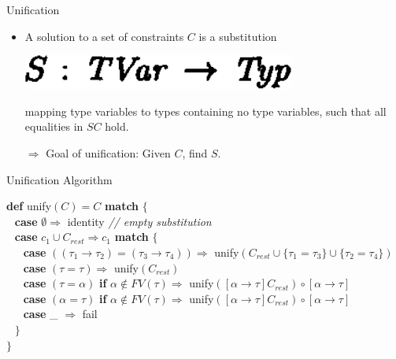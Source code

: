 \documentclass{beamer}
\begin{document}
\begin{frame}{Unification}
\begin{itemize}

\item A solution to a set of constraints $C$ is a substitution

\begin{center}
\includegraphics[scale=0.75]{paper_substitution_type.png}
\end{center}
\vspace{-0.5em}

mapping type variables to types containing no type variables,
such that all equalities in $SC$ hold.


\item[$\Rightarrow$] Goal of unification: Given $C$, find $S$.

\end{itemize}
\end{frame}

\begin{frame}{Unification Algorithm}

\begin{small}

\textbf{def} unify$(C) = C$ \textbf{match} $\{$ \\
$~~$ \textbf{case} $\emptyset \Rightarrow$ identity   \textit{// empty substitution}\\
$~~$ \textbf{case} $c_1 \cup C_{rest} \Rightarrow c_1 $ \textbf{match} $\{$\\
$~~$ $~~$ \textbf{case} $((\tau_1 \rightarrow \tau_2) = (\tau_3 \rightarrow \tau_4)) \Rightarrow$ unify$(C_{rest} \cup \{\tau_1 = \tau_3\} \cup \{\tau_2 = \tau_4\})$\\
$~~$ $~~$ \textbf{case} $(\tau = \tau) \Rightarrow$ unify$(C_{rest})$\\
$~~$ $~~$ \textbf{case} $(\tau = \alpha)$ \textbf{if} $\alpha \notin FV(\tau) \Rightarrow$ unify$([\alpha \rightarrow \tau]C_{rest}) \circ [\alpha \rightarrow \tau]$\\
$~~$ $~~$ \textbf{case} $(\alpha = \tau)$ \textbf{if} $\alpha \notin FV(\tau) \Rightarrow$ unify$([\alpha \rightarrow \tau]C_{rest}) \circ [\alpha \rightarrow \tau]$\\
$~~$ $~~$ \textbf{case} \_ $\Rightarrow$ fail\\
$~~$ $\}$\\
$\}$

\end{small}

\end{frame}
\end{document}
